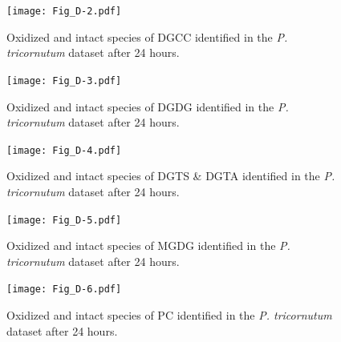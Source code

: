 \clearpage

\begin{figure}[!th]
\centering
\texttt{[image: Fig\_D-2.pdf]}
\caption[Oxidized and intact species of DGCC identified in the \emph{P. tricornutum} dataset after 24 hours]{Oxidized and intact species of DGCC identified in the \emph{P. tricornutum} dataset after 24 hours.}
\label{fig:adn2}
\end{figure}

\clearpage

\begin{figure}[!th]
\centering
\texttt{[image: Fig\_D-3.pdf]}
\caption[Oxidized and intact species of DGDG identified in the \emph{P. tricornutum} dataset after 24 hours]{Oxidized and intact species of DGDG identified in the \emph{P. tricornutum} dataset after 24 hours.}
\label{fig:adn3}
\end{figure}

\clearpage

\begin{figure}[!th]
\centering
\texttt{[image: Fig\_D-4.pdf]}
\caption[Oxidized and intact species of DGTS \& DGTA identified in the \emph{P. tricornutum} dataset after 24 hours]{Oxidized and intact species of DGTS \& DGTA identified in the \emph{P. tricornutum} dataset after 24 hours.}
\label{fig:adn4}
\end{figure}

\clearpage

\begin{figure}[!th]
\centering
\texttt{[image: Fig\_D-5.pdf]}
\caption[Oxidized and intact species of MGDG identified in the \emph{P. tricornutum} dataset after 24 hours]{Oxidized and intact species of MGDG identified in the \emph{P. tricornutum} dataset after 24 hours.}
\label{fig:adn5}
\end{figure}

\clearpage

\begin{figure}[!th]
\centering
\texttt{[image: Fig\_D-6.pdf]}
\caption[Oxidized and intact species of PC identified in the \emph{P. tricornutum} dataset after 24 hours]{Oxidized and intact species of PC identified in the \emph{P. tricornutum} dataset after 24 hours.}
\label{fig:adn6}
\end{figure}

\clearpage

